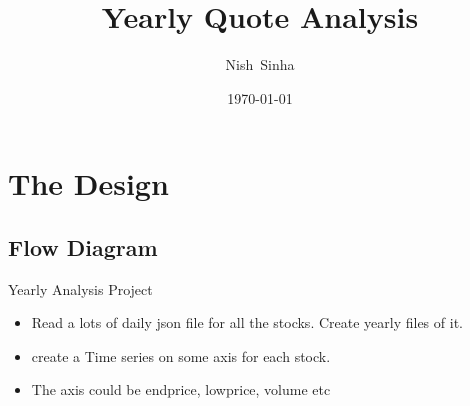 \documentclass{beamer}
\title[Anomaly Detection System Overview]
{%
Yearly Quote Analysis
%
}
\author[Sinha N]
{
  Nish~Sinha\inst{1} \and
}
\institute[Xad]
{
  \inst{1}%
  Nsinha Inc.,  CA, USA
  \and
  \vskip-2mm
}
\date[\today]
{\today}
\begin{document}
\begin{frame}
  \titlepage
\end{frame}



\section{The Design}

\subsection{Flow Diagram }

\begin{frame}{Yearly Analysis Project}
	\begin{itemize}
		\item Read a lots of  daily json file for all the stocks. Create yearly files of it.
		\item create a Time series  on some axis for each stock.
		\item The axis could be endprice, lowprice, volume etc
	\end{itemize}
\end{frame}
\end{document}
